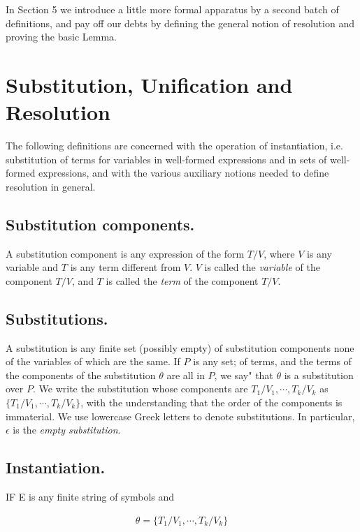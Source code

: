 \documentclass[8pt]{extarticle}
\begin{document}
In Section 5 we introduce a little more formal apparatus by a second batch of definitions, and pay off our debts by defining the general notion of resolution and proving the basic Lemma.

\section{Substitution, Unification and Resolution}

The following definitions are concerned with the operation of instantiation, i.e. substitution of terms for variables in well-formed expressions and in sets of well-formed expressions, and with the various auxiliary notions needed to define resolution in general.

\subsection{Substitution components.} A substitution component is any expression of
the form $T/V$, where $V$ is any variable and $T$ is any term different from $V$. $V$ is called the \emph{variable} of the component $T/V$, and $T$ is called the \emph{term} of the component $T/V$.

\subsection{Substitutions.}

A substitution is any finite set (possibly empty) of substitution components none of the variables of which are the same. If $P$ is any set; of terms, and the terms of the components of the substitution $\theta$ are all in $P$, we say" that $\theta$ is a substitution over $P$. We write the substitution whose components are $T_1/V_1, \dotsm , T_k/V_k$ as $\{T_1/V_1, \dotsm, T_k/V_k\}$, with the understanding that the order of the components is immaterial. We use lowercase Greek letters to denote substitutions. In particular, $\epsilon$ is the \emph{empty substitution}.

\subsection{Instantiation.}

IF E is any finite string of symbols and

\begin{align*}
    \theta = \{T_1/V_1, \dotsm, T_k/V_k\}
\end{align*}
\end{document}
